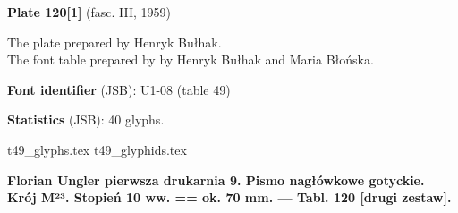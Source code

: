 \documentclass[12pt]{article}
\newcommand{\bg}{\begingl}
\newcommand{\pismoPL}[1]{{\relsize{2}\Junicode\textbf{#1}}}
\newcommand{\plate}[3]{\textbf{Plate #1} (fasc. #2, #3)}
\newcommand{\exampleBib}[1]{{\relsize{2}\Junicode\textbf{The
      example:}\\[2ex] CATALOGUS LIBRORUM \textbf{#1}}}
\newcommand{\exampleDesc}[1]{{\relsize{0}\Junicode#1}}
\newcommand{\exampleLib}[1]{{\relsize{0}\Junicode \textbf{Library:} #1}}
\newcommand{\examplePL}[1]{}
\newcommand{\exampleEN}[1]{}
\newcommand{\fontID}[2]{{\relsize{1}\Junicode\textbf{Font identifier} (JSB): #1 (table #2)}}
\newcommand{\fontstat}[1]{{\relsize{1}\Junicode\textbf{Statistics} (JSB): #1 glyphs.}}
\newcommand{\exampleRef}[1]{{\relsize{0}\Junicode \textbf{References:} #1}}
\newcommand{\examplePage}[1]{{Page reference: \relsize{0}\Junicode#1}}
\begin{document}
\plate{120[1]}{III}{1959}

The plate prepared by Henryk Bułhak.\\
The font table prepared by by Henryk Bułhak and  Maria Błońska.

\bigskip




  








\bigskip

\fontID{U1-08}{49}

\fontstat{40}

  {t49_glyphs.tex}
  {t49_glyphids.tex}


 
 \newpage
 

 

 \pismoPL{Florian Ungler pierwsza drukarnia 9. Pismo nagłówkowe
   gotyckie. Krój M²³. Stopień 10 ww. == ok. 70 mm. — Tabl. 120 [drugi
   zestaw].}
 
\end{document}
